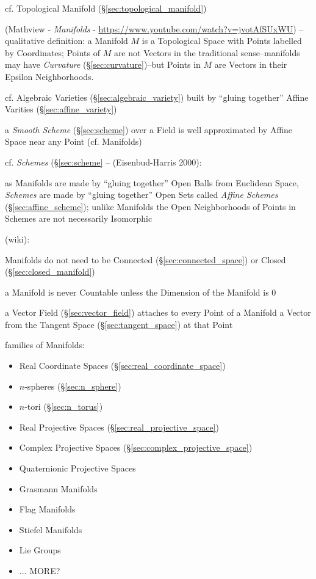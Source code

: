 cf. Topological Manifold (\S\ref{sec:topological_manifold})


(Mathview - \emph{Manifolds} -
\url{https://www.youtube.com/watch?v=jvotAfSUxWU}) -- qualitative definition: a
Manifold $M$ is a Topological Space with Points labelled by Coordinates;
Points of $M$ are not Vectors in the traditional sense--manifolds may have
\emph{Curvature} (\S\ref{sec:curvature})--but Points in $M$ are Vectors in their
Epsilon Neighborhoods.

cf. Algebraic Varieties (\S\ref{sec:algebraic_variety}) built by ``gluing
together'' Affine Varities (\S\ref{sec:affine_variety})

\fist a \emph{Smooth Scheme} (\S\ref{sec:scheme}) over a Field is well
approximated by Affine Space near any Point (cf. Manifolds)

\fist cf. \emph{Schemes} (\S\ref{sec:scheme} -- (Eisenbud-Harris 2000):

as Manifolds are made by ``gluing together'' Open Balls from Euclidean Space,
\emph{Schemes} are made by ``gluing together'' Open Sets called \emph{Affine
  Schemes} (\S\ref{sec:affine_scheme}); unlike Manifolds the Open Neighborhoods
of Points in Schemes are not necessarily Isomorphic

(wiki):

Manifolds do not need to be Connected (\S\ref{sec:connected_space}) or Closed
(\S\ref{sec:closed_manifold})

a Manifold is never Countable unless the Dimension of the Manifold is $0$

a Vector Field (\S\ref{sec:vector_field}) attaches to every Point of a Manifold
a Vector from the Tangent Space (\S\ref{sec:tangent_space}) at that Point

families of Manifolds:
\begin{itemize}
  \item Real Coordinate Spaces (\S\ref{sec:real_coordinate_space})
  \item $n$-spheres (\S\ref{sec:n_sphere})
  \item $n$-tori (\S\ref{sec:n_torus})
  \item Real Projective Spaces (\S\ref{sec:real_projective_space})
  \item Complex Projective Spaces (\S\ref{sec:complex_projective_space})
  \item Quaternionic Projective Spaces
  \item Grasmann Manifolds
  \item Flag Manifolds
  \item Stiefel Manifolds
  \item Lie Groups
  \item ... MORE?
\end{itemize}

